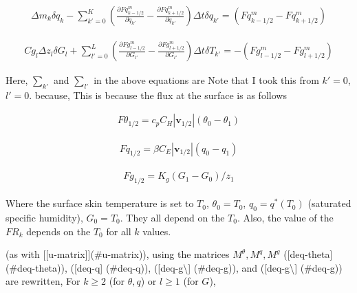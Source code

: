 \begin{eqnarray}
  \Delta m_k \delta q_k
  -  \sum_{k'=0}^{K} \left(  \frac{\partial Fq^{m}_{k-1/2}}{\partial q_{k'}} 
                            - \frac{\partial Fq^{m}_{k+1/2}}{\partial q_{k'}} \right)
                 \Delta t\delta q_{k'}
  = ( Fq^{m}_{k-1/2} - Fq^{m}_{k+1/2} )
\end{eqnarray}

\begin{quote}
\protect\hypertarget{deq-q}{}{\blazer[deq-q]}
\end{quote}

\begin{eqnarray}
  Cg_l \Delta z_l \delta G_l
  +  \sum_{l'=0}^{L} \left(  \frac{\partial Fg^{m}_{l-1/2}}{\partial G_{l'}} 
                            - \frac{\partial Fg^{m}_{l+1/2}}{\partial G_{l'}} \right)
                 \Delta t\delta T_{k'}
  = - ( Fg^{m}_{l-1/2} - Fg^{m}_{l+1/2} )
\end{eqnarray}

\begin{quote}
\protect\hypertarget{deq-g}{}{\blazer[deq-g]}
\end{quote}

Here, \(\sum_{k'}\) and \(\sum_{l'}\) in the above equations are Note
that I took this from \(k'=0\), \(l'=0\). because, This is because the
flux at the surface is as follows

\begin{eqnarray}
  F\theta_{1/2} =  c_p C_H |\mathbf{v}_{1/2}| (\theta_0 - \theta_1)
\end{eqnarray}

\begin{eqnarray}
  Fq_{1/2} =  \beta C_E |\mathbf{v}_{1/2}| (q_0 - q_1)
\end{eqnarray}

\begin{eqnarray}
  Fg_{1/2} =  K_g (G_1 - G_0)/z_1
\end{eqnarray}

Where the surface skin temperature is set to \(T_0\),
\(\theta_0 = T_0\), \(q_0 = q^*(T_0)\) (saturated specific humidity),
\(G_0 = T_0\). They all depend on the \(T_0\). Also, the value of the
\(FR_{k}\) depends on the \(T_0\) for all \(k\) values.

(as with {[}{[}u-matrix{]}{]}(\#u-matrix)), using the matrices
\(M^{\theta}, M^q, M^g\) ({[}deq-theta{]} (\#deq-theta)), ({[}deq-q{]}
(\#deq-q)), ({[}deq-g\textbackslash{]} (\#deq-g)), and
({[}deq-g\textbackslash{]} (\#deq-g)) are rewritten, For \(k \ge 2\)
(for \(\theta, q\)) or \(l \ge 1\) (for \(G\)),

